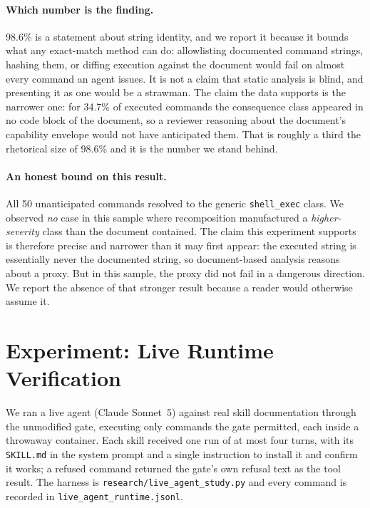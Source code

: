 \documentclass[10pt]{article}
\begin{document}
\paragraph{Which number is the finding.} 98.6\% is a statement about string
identity, and we report it because it bounds what any exact-match method can do:
allowlisting documented command strings, hashing them, or diffing execution against
the document would fail on almost every command an agent issues. It is not a claim
that static analysis is blind, and presenting it as one would be a strawman. The
claim the data supports is the narrower one: for 34.7\% of executed commands the
consequence class appeared in no code block of the document, so a reviewer reasoning
about the document's capability envelope would not have anticipated them. That is
roughly a third the rhetorical size of 98.6\% and it is the number we stand behind.

\paragraph{An honest bound on this result.} All 50 unanticipated commands resolved
to the generic \texttt{shell\_exec} class. We observed \emph{no} case in this
sample where recomposition manufactured a \emph{higher-severity} class than the
document contained. The claim this experiment supports is therefore precise and
narrower than it may first appear: the executed string is essentially never the
documented string, so document-based analysis reasons about a proxy. But in this
sample, the proxy did not fail in a dangerous direction. We report the absence of that stronger
result because a reader would otherwise assume it.

\section{Experiment: Live Runtime Verification}
\label{sec:runtime}

We ran a live agent (Claude Sonnet~5) against real skill documentation through the
unmodified gate, executing only commands the gate permitted, each inside a throwaway
container. Each skill received one run of at most four turns, with its
\texttt{SKILL.md} in the system prompt and a single instruction to install it and
confirm it works; a refused command returned the gate's own refusal text as the tool
result. The harness is \texttt{research/live\_agent\_study.py} and every command is
recorded in \texttt{live\_agent\_runtime.jsonl}.
\end{document}

